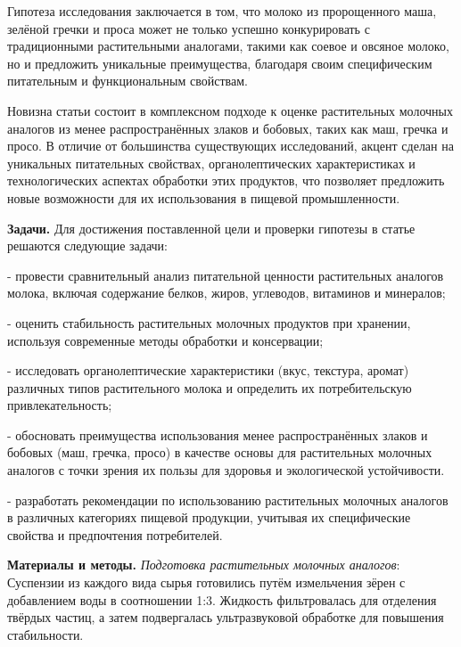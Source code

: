 \begin{multicols}{2}
Гипотеза исследования заключается в том, что молоко из пророщенного
маша, зелёной гречки и проса может не только успешно конкурировать с
традиционными растительными аналогами, такими как соевое и овсяное
молоко, но и предложить уникальные преимущества, благодаря своим
специфическим питательным и функциональным свойствам.

Новизна статьи состоит в комплексном подходе к оценке растительных
молочных аналогов из менее распространённых злаков и бобовых, таких как
маш, гречка и просо. В отличие от большинства существующих исследований,
акцент сделан на уникальных питательных свойствах, органолептических
характеристиках и технологических аспектах обработки этих продуктов, что
позволяет предложить новые возможности для их использования в пищевой
промышленности.

{\bfseries Задачи.} Для достижения поставленной цели и проверки гипотезы в
статье решаются следующие задачи:

- провести сравнительный анализ питательной ценности растительных
аналогов молока, включая содержание белков, жиров, углеводов, витаминов
и минералов;

- оценить стабильность растительных молочных продуктов при хранении,
используя современные методы обработки и консервации;

- исследовать органолептические характеристики (вкус, текстура, аромат)
различных типов растительного молока и определить их потребительскую
привлекательность;

- обосновать преимущества использования менее распространённых злаков и
бобовых (маш, гречка, просо) в качестве основы для растительных молочных
аналогов с точки зрения их пользы для здоровья и экологической
устойчивости.

- разработать рекомендации по использованию растительных молочных
аналогов в различных категориях пищевой продукции, учитывая их
специфические свойства и предпочтения потребителей.

{\bfseries Материалы и методы.} \emph{Подготовка растительных молочных
аналогов}: Суспензии из каждого вида сырья готовились путём
измельчения зёрен с добавлением воды в соотношении 1:3. Жидкость
фильтровалась для отделения твёрдых частиц, а затем подвергалась
ультразвуковой обработке для повышения стабильности.
\end{multicols}

